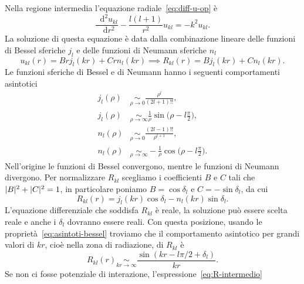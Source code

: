 \documentclass[a4paper,fleqn,twoside,12pt]{article}
\newcommand*{\dd}{\mathop{}\!\mathrm{d}} %
\DeclarePairedDelimiter{\abs}{\lvert}{\rvert}
\newcommand*{\toder}[3][]{\frac{{\dd^{#1}}#2}{\dd {#3}^{#1}}}
\begin{document}
Nella regione intermedia l'equazione radiale~\eqref{eq:diff-u-op} è
\begin{equation}
  \toder[2]{u_{kl}}{r} - \frac{l(l+1)}{r^{2}}u_{kl} = -k^{2}u_{kl}.
\end{equation}
La soluzione di questa equazione è data dalla combinazione lineare delle
funzioni di Bessel sferiche $j_{l}$ e delle funzioni di Neumann sferiche $n_{l}$
\begin{equation}
  u_{kl}(r) = Brj_{l}(kr) + Crn_{l}(kr) \implies R_{kl}(r) = Bj_{l}(kr) +
  Cn_{l}(kr).
\end{equation}
Le funzioni sferiche di Bessel e di Neumann hanno i seguenti comportamenti
asintotici
\begin{subequations}
  \label{eq:asintoti-bessel}
  \begin{align}
    \label{eq:jl-asintotico-orig}
    j_{l}(\rho) &\underset{\rho \to 0}{\sim} \frac{\rho^{l}}{(2l+1)!!}, \\
    \label{eq:jl-asintotico-inf}
    j_{l}(\rho) &\underset{\rho \to \infty}{\sim} \frac{1}{\rho} \sin\bigg(\rho
    - l \frac{\pi}{2}\bigg), \\
    n_{l}(\rho) &\underset{\rho \to 0}{\sim} \frac{(2l-1)!!}{\rho^{l+1}}, \\
    n_{l}(\rho) &\underset{\rho \to \infty}{\sim} -\frac{1}{\rho}\cos\bigg(\rho
    - l \frac{\pi}{2}\bigg).
  \end{align}
\end{subequations}
Nell'origine le funzioni di Bessel convergono, mentre le funzioni di Neumann
divergono.  Per normalizzare $R_{kl}$ scegliamo i coefficienti $B$ e $C$ tali
che $\abs{B}^{2} + \abs{C}^{2} = 1$, in particolare poniamo $B = \cos\delta_{l}$
e $C = -\sin\delta_{l}$, da cui
\begin{equation}
  \label{eq:R-intermedio}
  R_{kl}(r) = j_{l}(kr)\cos\delta_{l} - n_{l}(kr)\sin\delta_{l}.
\end{equation}
L'equazione differenziale che soddisfa $R_{kl}$ è reale, la soluzione può essere
scelta reale e anche i $\delta_{l}$ dovranno essere reali.  Con questa
posizione, usando le proprietà~\eqref{eq:asintoti-bessel} troviamo che il
comportamento asintotico per grandi valori di $kr$, cioè nella zona di
radiazione, di $R_{kl}$ è
\begin{equation}
  \label{eq:R-asintotico}
  R_{kl}(r) \underset{kr \to \infty}{\sim} \frac{\sin(kr - l\pi/2 +
    \delta_{l})}{kr}.
\end{equation}
Se non ci fosse potenziale di interazione, l'espressione~\eqref{eq:R-intermedio}
\end{document}

